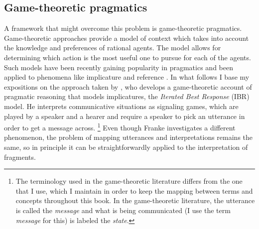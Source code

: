 \subsection{Game-theoretic pragmatics}
A framework that might overcome this problem is game-theoretic pragmatics. Game-theoretic approaches provide a model of context which takes into account the knowledge and preferences of rational agents. The model allows for determining which action is the most useful one to pursue for each of the agents. Such models have been recently gaining popularity in pragmatics and been applied to phenomena like implicature \citep{vanrooy2004, benz.vanrooij2007, franke2009, jager2012, goodman.stuhlmuller2013, gotzner.benz2018} and reference \citep{frank.goodman2012, rohde.etal2012, sikos.etal2019}. In what follows I base my expositions on the approach taken by \citet{franke2009}, who develops a game-theoretic account of pragmatic reasoning that models implicatures, the \textit{Iterated Best Response} (IBR) model. He interprets communicative situations as signaling games, which are played by a speaker and a hearer and require a speaker to pick an utterance in order to get a message across.%
%
\footnote{The terminology used in the game-theoretic literature differs from the one that I use, which I maintain in order to keep the mapping between terms and concepts throughout this book. In the game-theoretic literature, the utterance is called the \textit{message} and what is being communicated (I use the term \textit{message} for this) is labeled the \textit{state}.}\afterfn%
%
Even though Franke investigates a different phenomenon, the problem of mapping utterances and interpretations remains the same, so in principle it can be straightforwardly applied to the interpretation of fragments.

